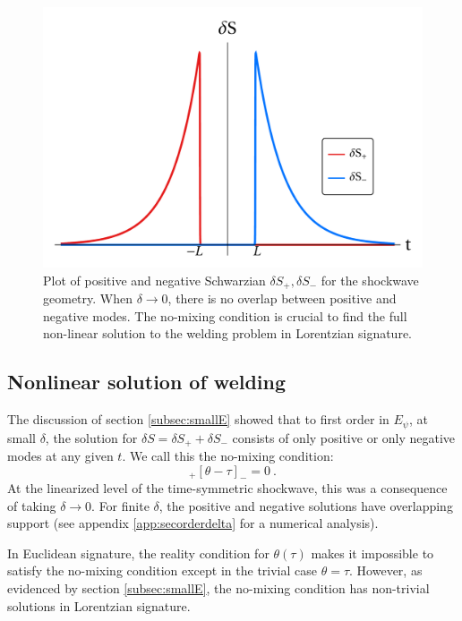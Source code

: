 \documentclass[11pt,oneside,letterpaper]{article}
\newcommand{\be}{\begin{equation}}
\newcommand{\ee}{\end{equation}}
\def\be{\begin{eqnarray}}
\def\ee{\end{eqnarray}}
\def\be{\begin{equation}}
\def\ee{\end{equation}}
\numberwithin{equation}{section}
\def\be{\begin{equation}}
\def\ee{\end{equation}}
\def \be {\begin{equation}}
\def \ee {\end{equation}}
\begin{document}
\begin{spacing}{1.1}
\begin{figure}[h!]
\centering
\includegraphics[scale=0.3]{./figures/delta_to_zero.pdf}
\caption{Plot of positive and negative Schwarzian $\delta S_+, \delta S_-$ for the shockwave geometry. When $\delta \to0$, there is no overlap between positive and negative modes. The no-mixing condition is crucial to find the full non-linear solution to the welding problem in Lorentzian signature. \label{fig:delSchw}}
\end{figure}

\subsection{Nonlinear solution of welding }
The discussion of section \ref{subsec:smallE} showed that to first  order in $E_\psi$, at small $\delta$, the solution for $\delta S= \delta S_+ +\delta S_-$ consists of only positive or only negative modes at any given $t$. We call this the no-mixing condition: 
\be
[\theta - \tau]_+ [\theta-\tau]_- = 0 \ .
\ee 
At the linearized level of the time-symmetric shockwave, this was a consequence of taking $\delta \to 0$. For finite $\delta$, the positive and negative solutions have overlapping support (see appendix \ref{app:secorderdelta} for a numerical analysis). 

In Euclidean signature, the reality condition for $\theta(\tau)$ makes it impossible to satisfy the no-mixing condition except in the trivial case $\theta = \tau$. However, as evidenced by section \ref{subsec:smallE}, the no-mixing condition has non-trivial solutions in Lorentzian signature. 


\end{spacing}
\end{document}

